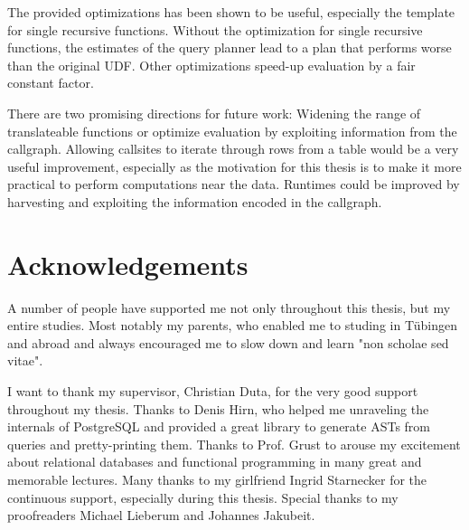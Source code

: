 The provided optimizations has been shown to be useful, especially the template for single recursive functions. Without the optimization for single recursive functions, the estimates of the query planner lead to a plan that performs worse than the original UDF. Other optimizations speed-up evaluation by a fair constant factor.

There are two promising directions for future work: Widening the range of translateable functions or optimize evaluation by exploiting information from the callgraph. Allowing callsites to iterate through rows from a table would be a very useful improvement, especially as the motivation for this thesis is to make it more practical to perform computations near the data. Runtimes could be improved by harvesting and exploiting the information encoded in the callgraph.

\section*{Acknowledgements}
A number of people have supported me not only throughout this thesis, but my entire studies. Most notably my parents, who enabled me to studing in Tübingen and abroad and always encouraged me to slow down and learn "non scholae sed vitae".

I want to thank my supervisor, Christian Duta, for the very good support throughout my thesis. Thanks to Denis Hirn, who helped me unraveling the internals of PostgreSQL and provided a great library to generate ASTs from queries and pretty-printing them. Thanks to Prof. Grust to arouse my excitement about relational databases and functional programming in many great and memorable lectures. 
Many thanks to my girlfriend Ingrid Starnecker for the continuous support, especially during this thesis. Special thanks to my proofreaders Michael Lieberum and Johannes Jakubeit.